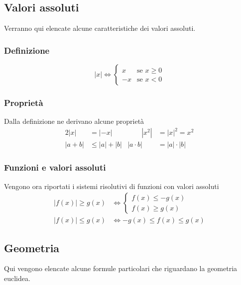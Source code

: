 \subsection{Valori assoluti}
Verranno qui elencate alcune caratteristiche dei valori assoluti.

\subsubsection{Definizione}
\begin{equation*}
  \left\lvert x\right\rvert \Leftrightarrow
  \begin{cases}
    x &\text{se } x \geq 0\\
    -x &\text{se } x < 0
  \end{cases}
\end{equation*}

\subsubsection{Proprietà}
Dalla definizione ne derivano alcune proprietà
\begin{alignat*}{2}
  \left\lvert x\right\rvert &= \left\lvert -x\right\rvert &\qquad 
  \left\lvert x^2\right\rvert&=\left\lvert x\right\rvert^2 = x^2\\
  \left\lvert a+b\right\rvert &\leq \left\lvert a\right\rvert+\left\lvert b\right\rvert & 
  \left\lvert a\cdot b\right\rvert&=\left\lvert a\right\rvert\cdot\left\lvert b\right\rvert
\end{alignat*}

\subsubsection{Funzioni e valori assoluti}
Vengono ora riportati i sistemi risolutivi di funzioni con valori assoluti
\begin{align*}
  \left\lvert f(x)\right\rvert \geq g(x) &\Leftrightarrow 
  \begin{cases}
    f(x) \leq -g(x)\\
    f(x) \geq g(x)
  \end{cases}\\
  \left\lvert f(x)\right\rvert \leq g(x) &\Leftrightarrow -g(x)\leq f(x) \leq g(x)
\end{align*}

\subsection{Geometria}
Qui vengono elencate alcune formule particolari che riguardano la geometria euclidea.

